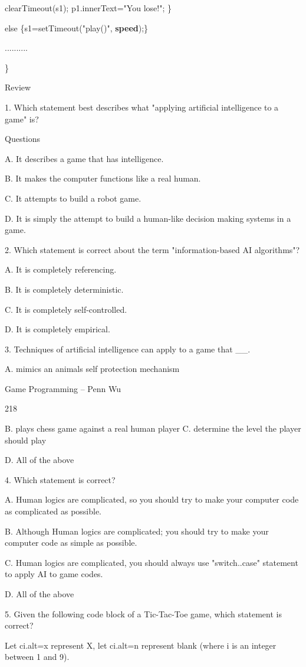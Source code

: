 \documentclass[
]{article}
\begin{document}
clearTimeout(s1); p1.innerText="You lose!"; \}

else \{s1=setTimeout("play()", \textbf{speed});\}

..........

\}

Review

1. Which statement best describes what "applying artificial intelligence
to a game" is?

Questions

A. It describes a game that has intelligence.

B. It makes the computer functions like a real human.

C. It attempts to build a robot game.

D. It is simply the attempt to build a human-like decision making
systems in a game.

2. Which statement is correct about the term "information-based AI
algorithms"?

A. It is completely referencing.

B. It is completely deterministic.

C. It is completely self-controlled.

D. It is completely empirical.

3. Techniques of artificial intelligence can apply to a game that \_\_.

A. mimics an animal\textquotesingle s self protection mechanism

Game Programming -- Penn Wu

218

\protect\hypertarget{index_split_011.htmlux5cux23p219}{}{}B. plays chess
game against a real human player C. determine the level the player
should play

D. All of the above

4. Which statement is correct?

A. Human logics are complicated, so you should try to make your computer
code as complicated as possible.

B. Although Human logics are complicated; you should try to make your
computer code as simple as possible.

C. Human logics are complicated, you should always use "switch..case"
statement to apply AI to game codes.

D. All of the above

5. Given the following code block of a Tic-Tac-Toe game, which statement
is correct?

Let ci.alt=x represent X, let
ci.alt=\textquotesingle n\textquotesingle{} represent blank (where i is
an integer between 1 and 9).
\end{document}
